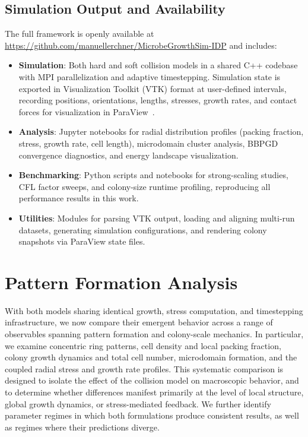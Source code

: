 \documentclass[a4paper,fleqn]{cas-dc}
\providecommand{\DIFaddend}{} %
\DeclareRobustCommand{\DIFaddend}{\DIFOaddend \let\includegraphics\DIFOincludegraphics} %
\begin{document}
\DIFaddend \subsection{Simulation Output and Availability}

The full framework is openly available at \url{https://github.com/manuellerchner/MicrobeGrowthSim-IDP} and includes:

\begin{itemize}
    \item \textbf{Simulation}: Both hard and soft collision models in a shared C++ codebase with MPI parallelization and adaptive timestepping. Simulation state is exported in Visualization Toolkit (VTK) format at user-defined intervals, recording positions, orientations, lengths, stresses, growth rates, and contact forces for visualization in ParaView~\cite{ahrens2005paraview}.

    \item \textbf{Analysis}: Jupyter notebooks for radial distribution profiles (packing fraction, stress, growth rate, cell length), microdomain cluster analysis, BBPGD convergence diagnostics, and energy landscape visualization.

    \item \textbf{Benchmarking}: Python scripts and notebooks for strong-scaling studies, CFL factor sweeps, and colony-size runtime profiling, reproducing all performance results in this work.

    \item \textbf{Utilities}: Modules for parsing VTK output, loading and aligning multi-run datasets, generating simulation configurations, and rendering colony snapshots via ParaView state files.
\end{itemize}

\section{Pattern Formation Analysis}

With both models sharing identical growth, stress computation, and timestepping infrastructure, we now compare their emergent behavior across a range of observables spanning pattern formation and colony-scale mechanics. In particular, we examine concentric ring patterns, cell density and local packing fraction, colony growth dynamics and total cell number, microdomain formation, and the coupled radial stress and growth rate profiles. This systematic comparison is designed to isolate the effect of the collision model on macroscopic behavior, and to determine whether differences manifest primarily at the level of local structure, global growth dynamics, or stress-mediated feedback. We further identify parameter regimes in which both formulations produce consistent results, as well as regimes where their predictions diverge.
\end{document}
